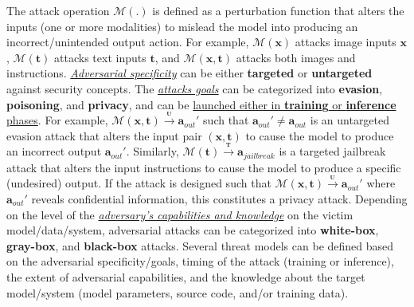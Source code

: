 The attack operation $\mathcal{M}(.)$ is defined as a perturbation function that alters the inputs (one or more 
modalities) to mislead the model into producing an incorrect/unintended output action.
For example, $\mathcal{M}(\bm{x})$ attacks image inputs $\bm{x}$, $\mathcal{M}(\bm{t})$ attacks text inputs $\bm{t}$, and $\mathcal{M}(\bm{x}, \bm{t})$ attacks both images and instructions.
\ul{\emph{Adversarial specificity}} can be either \textbf{targeted} or \textbf{untargeted} against security concepts. %
The \ul{\emph{attacks goals}} can be categorized into \textbf{evasion}, \textbf{poisoning}, and \textbf{privacy}, and can be \ul{launched either in \textbf{training} or \textbf{inference} phases}.
For example, $\mathcal{M}(\bm{x},\bm{t}) \xrightarrow{{}_{\textbf{U}}} \bm{a}_{out}'$ such that $\bm{a}_{out}' \neq \bm{a}_{out}$ is an untargeted evasion attack that alters the input pair $(\bm{x},\bm{t})$ to cause the model to produce an incorrect output $\bm{a}_{out}'$.
Similarly, $\mathcal{M}(\bm{t}) \xrightarrow{{}_{\textbf{T}}} \bm{a}_{jailbreak}$ is a targeted jailbreak attack that alters the input instructions to cause the model to produce a specific (undesired) output.
If the attack is designed such that $\mathcal{M}(\bm{x},\bm{t}) \xrightarrow{{}_{\textbf{U}}} \bm{a}_{out}'$ where $\bm{a}_{out}'$ reveals confidential information, this constitutes a privacy attack.
Depending on the level of the \ul{\emph{adversary's capabilities and knowledge}} on the victim model/data/system, adversarial attacks can be categorized into \textbf{white-box}, \textbf{gray-box}, and \textbf{black-box} attacks. 
Several threat models can be defined based on the adversarial specificity/goals, timing of the attack (\eg training or inference), the extent of adversarial capabilities, and the knowledge about the target model/system (\eg model parameters, source code, and/or training data).

